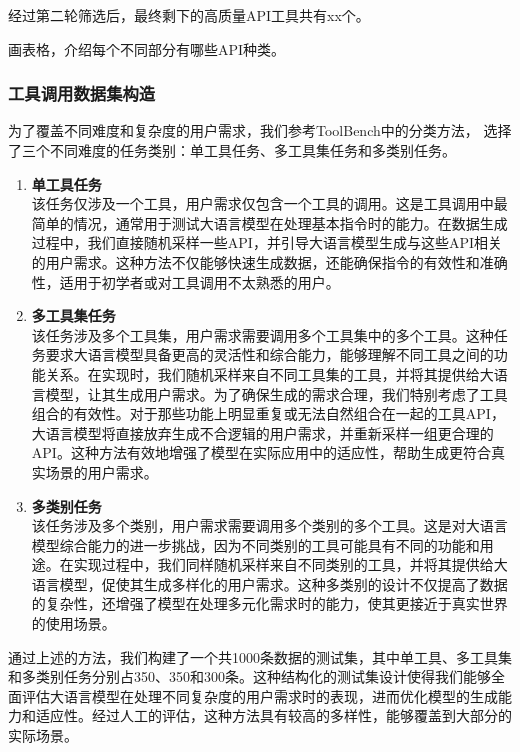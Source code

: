 经过第二轮筛选后，最终剩下的高质量API工具共有xx个。

画表格，介绍每个不同部分有哪些API种类。

\subsubsection{工具调用数据集构造}

为了覆盖不同难度和复杂度的用户需求，我们参考ToolBench中的分类方法，
选择了三个不同难度的任务类别：单工具任务、多工具集任务和多类别任务。

\begin{enumerate}
  \item \textbf{单工具任务} \\
    该任务仅涉及一个工具，用户需求仅包含一个工具的调用。这是工具调用中最简单的情况，通常用于测试大语言模型在处理基本指令时的能力。在数据生成过程中，我们直接随机采样一些API，并引导大语言模型生成与这些API相关的用户需求。这种方法不仅能够快速生成数据，还能确保指令的有效性和准确性，适用于初学者或对工具调用不太熟悉的用户。

  \item \textbf{多工具集任务} \\
    该任务涉及多个工具集，用户需求需要调用多个工具集中的多个工具。这种任务要求大语言模型具备更高的灵活性和综合能力，能够理解不同工具之间的功能关系。在实现时，我们随机采样来自不同工具集的工具，并将其提供给大语言模型，让其生成用户需求。为了确保生成的需求合理，我们特别考虑了工具组合的有效性。对于那些功能上明显重复或无法自然组合在一起的工具API，大语言模型将直接放弃生成不合逻辑的用户需求，并重新采样一组更合理的API。这种方法有效地增强了模型在实际应用中的适应性，帮助生成更符合真实场景的用户需求。

  \item \textbf{多类别任务} \\
    该任务涉及多个类别，用户需求需要调用多个类别的多个工具。这是对大语言模型综合能力的进一步挑战，因为不同类别的工具可能具有不同的功能和用途。在实现过程中，我们同样随机采样来自不同类别的工具，并将其提供给大语言模型，促使其生成多样化的用户需求。这种多类别的设计不仅提高了数据的复杂性，还增强了模型在处理多元化需求时的能力，使其更接近于真实世界的使用场景。

\end{enumerate}

通过上述的方法，我们构建了一个共1000条数据的测试集，其中单工具、多工具集和多类别任务分别占350、350和300条。这种结构化的测试集设计使得我们能够全面评估大语言模型在处理不同复杂度的用户需求时的表现，进而优化模型的生成能力和适应性。经过人工的评估，这种方法具有较高的多样性，能够覆盖到大部分的实际场景。

